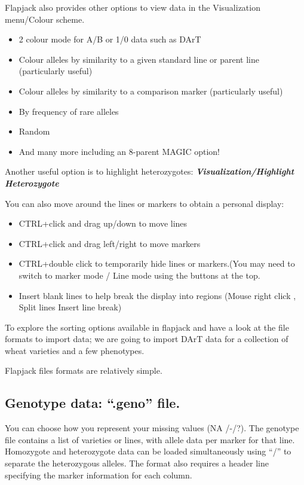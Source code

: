 \documentclass[
]{book}
\providecommand{\tightlist}{%
  \setlength{\itemsep}{0pt}\setlength{\parskip}{0pt}}
\begin{document}
Flapjack also provides other options to view data in the Visualization menu/Colour scheme.

\begin{itemize}
\tightlist
\item
  2 colour mode for A/B or 1/0 data such as DArT
\item
  Colour alleles by similarity to a given standard line or parent line (particularly useful)
\item
  Colour alleles by similarity to a comparison marker (particularly useful)
\item
  By frequency of rare alleles
\item
  Random
\item
  And many more including an 8-parent MAGIC option!
\end{itemize}

Another useful option is to highlight heterozygotes: \textbf{\emph{Visualization/Highlight Heterozygote}}

You can also move around the lines or markers to obtain a personal display:

\begin{itemize}
\tightlist
\item
  CTRL+click and drag up/down to move lines
\item
  CTRL+click and drag left/right to move markers
\item
  CTRL+double click to temporarily hide lines or markers.(You may need to switch to marker mode / Line mode using the buttons at the top.
\item
  Insert blank lines to help break the display into regions (Mouse right click , Split lines Insert line break)
\end{itemize}

To explore the sorting options available in flapjack and have a look at the file formats to import data; we are going to import DArT data for a collection of wheat varieties and a few
phenotypes.

Flapjack files formats are relatively simple.

\hypertarget{genotype-data-.geno-file.}{%
\subsection{Genotype data: ``.geno'' file.}\label{genotype-data-.geno-file.}}

You can choose how you represent your missing values (NA /-/?). The genotype file contains a list of varieties or lines, with allele data per marker for that line. Homozygote and heterozygote data can be loaded simultaneously using ``/'' to separate the heterozygous alleles. The format also requires a header line specifying the marker information for each column.
\end{document}
